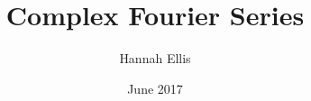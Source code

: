 \documentclass[11pt,twoside,a4paper]{article}
\begin{document}
\title{Complex Fourier Series}
\author{Hannah Ellis}
\date{June 2017}
\maketitle
\end{document}
